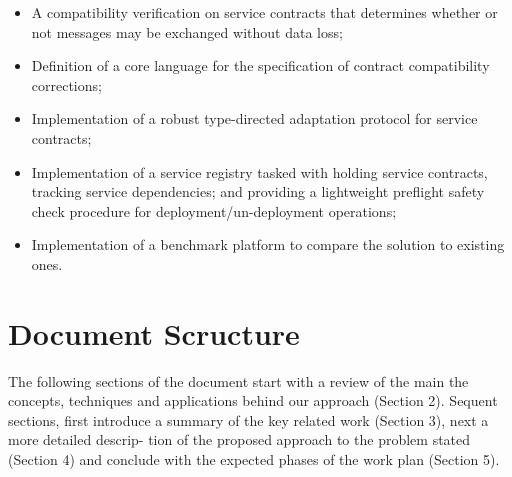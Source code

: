 \begin{itemize}
    \item A compatibility verification on service contracts that determines whether or not messages may be exchanged without data loss;
    \item Definition of a core language for the specification of contract compatibility corrections;
    \item Implementation of a robust type-directed adaptation protocol for service contracts;
    \item Implementation of a service registry tasked with holding service contracts, tracking service dependencies;
    and providing a lightweight preflight safety check procedure for deployment/un-deployment operations;
    \item Implementation of a benchmark platform to compare the solution to existing ones.
\end{itemize}

\section{Document Scructure} %
\label{sec:document_structure}

The following sections of the document start with a review of the main the concepts,
techniques and applications behind our approach (Section 2).
Sequent sections, first introduce a summary of the key related work (Section 3), next a more detailed descrip-
tion of the proposed approach to the problem stated (Section 4) and conclude with the
expected phases of the work plan (Section 5).